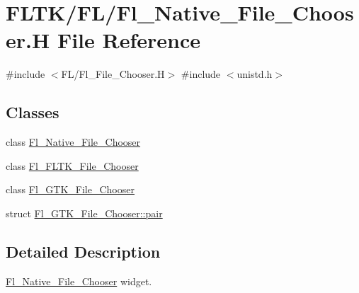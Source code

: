 \hypertarget{_fl___native___file___chooser_8_h}{}\section{F\+L\+T\+K/\+F\+L/\+Fl\+\_\+\+Native\+\_\+\+File\+\_\+\+Chooser.H File Reference}
\label{_fl___native___file___chooser_8_h}
{\ttfamily \#include $<$F\+L/\+Fl\+\_\+\+File\+\_\+\+Chooser.\+H$>$}\newline
{\ttfamily \#include $<$unistd.\+h$>$}\newline
\subsection*{Classes}
\begin{DoxyCompactItemize}
\item 
class \hyperlink{class_fl___native___file___chooser}{Fl\+\_\+\+Native\+\_\+\+File\+\_\+\+Chooser}
\item 
class \hyperlink{class_fl___f_l_t_k___file___chooser}{Fl\+\_\+\+F\+L\+T\+K\+\_\+\+File\+\_\+\+Chooser}
\item 
class \hyperlink{class_fl___g_t_k___file___chooser}{Fl\+\_\+\+G\+T\+K\+\_\+\+File\+\_\+\+Chooser}
\item 
struct \hyperlink{struct_fl___g_t_k___file___chooser_1_1pair}{Fl\+\_\+\+G\+T\+K\+\_\+\+File\+\_\+\+Chooser\+::pair}
\end{DoxyCompactItemize}


\subsection{Detailed Description}
\hyperlink{class_fl___native___file___chooser}{Fl\+\_\+\+Native\+\_\+\+File\+\_\+\+Chooser} widget. 